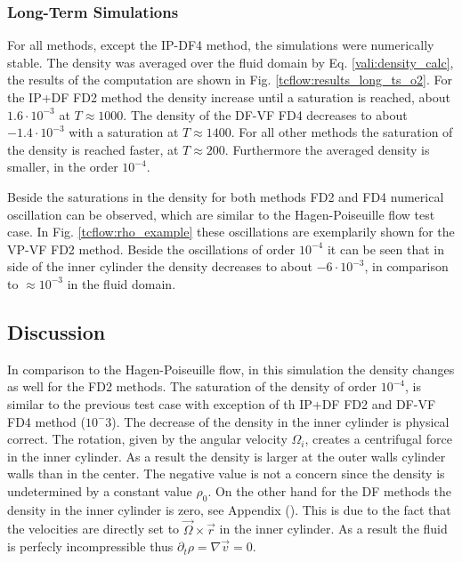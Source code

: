 \clearpage

\subsubsection{Long-Term Simulations}

For all methods, except the IP-DF4 method, the simulations were numerically stable.
The density was averaged over the fluid domain by Eq.  \ref{vali:density_calc},
the results of the computation are shown in Fig. \ref{tcflow:results_long_ts_o2}.
For the IP+DF FD2 method the density increase until a saturation is reached, about $1.6\cdot10^{-3}$ at $T\approx 1000$.
The density of the  DF-VF FD4 decreases to about $-1.4\cdot10^{-3}$ with a saturation at $T\approx1400$.
For all other methods the saturation of the density is reached faster, at $T\approx200$.
Furthermore the averaged density is smaller, in the order $10^{-4}$.

Beside the saturations in the density for both methods FD2 and FD4 numerical oscillation can be
observed, which  are similar to the Hagen-Poiseuille flow test case.
In Fig. \ref{tcflow:rho_example} these oscillations are exemplarily shown for the VP-VF FD2 method.
Beside the oscillations of order $10^{-4}$ it can be seen that in side of the inner cylinder the
density decreases to about $-6\cdot10^{-3}$, in comparison to $\approx10^{-3}$ in the fluid domain.

\subsection{Discussion}

In comparison to the Hagen-Poiseuille flow, in this simulation
the density  changes as well for the FD2 methods.
The saturation of the density of order $10^{-4}$,
is similar to the previous test case with exception of th IP+DF FD2 and DF-VF FD4 method ($10^-3$).
The decrease of the density in the inner cylinder is physical correct.
The rotation, given by the angular velocity $\Omega_i$, creates a centrifugal force in the inner cylinder.
As a result the density is larger at the outer walls cylinder walls than in the center.
The negative value is not a concern since the density is undetermined by a constant value $\rho_0$.
On the other hand for the DF methods the density in the inner cylinder is zero, see Appendix ().
This is due to the fact that the velocities are directly set to $\vec{\Omega}\times\vec{r}$ in the inner cylinder.
As a result the fluid is perfecly incompressible thus $\partial_t\rho = \nabla \vec{v} = 0$.

